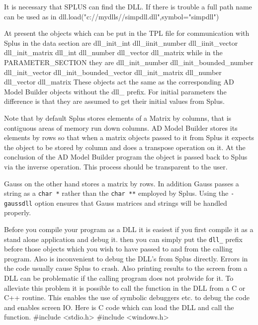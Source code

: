 It is necessary that SPLUS can find the DLL. If there is trouble a full
path name can be used as in
\beginexample
dll.load("c://mydlls//simpdll.dll",symbol="simpdll")
\endexample

At present the objects which can be put in the TPL file for communication
with Splus in the data section are
\beginexample
dll_init_int
dll_iinit_number
dll_iinit_vector
dll_init_matrix
dll_int
dll_number
dll_vector
dll_matrix
\endexample
while in the PARAMETER\_SECTION they are
\beginexample
dll_init_number
dll_init_bounded_number
dll_init_vector
dll_init_bounded_vector
dll_init_matrix
dll_number
dll_vector
dll_matrix
\endexample
These objects act the same as the corresponding AD Model Builder objects
without the dll\_ prefix. For initial parameters the difference is that
they are assumed to get their initial values from Splus.

Note that by default Splus stores elements of a Matrix by columns, that
is contiguous areas of memory run down columns. AD Model Builder stores
its elements by rows so that when a matrix objects passed to it from
Splus it expects the object to be stored by column and does a transpose
operation on it. At the  conclusion of the AD Model Builder program
the object is passed back to Splus via the inverse operation. This
process should be transparent to the user. 

Gauss on the other hand stores a matrix by rows. 
In addition Gauss passes a string as a {\tt char *} rather than the
{\tt char **} employed by Splus.
Using the {\tt -gaussdll}
option ensures that Gauss matrices and strings will be handled properly.

Before you compile your program as a DLL it is easiest if you
first compile it as a stand alone application and debug it.
then you can simply put the {\tt dll\_} prefix before
those objects which you wish to have passed to and from
the calling program.
Also is inconvenient to debug the DLL's from Splus directly.
Errors in the code usually cause Splus to crash. 
Also printing results to the screen from a DLL can
be problematic if the calling program does not
probvide for it. To alleviate this
problem it is possible to call the function in the DLL
from a C or C++ routine. This enables the use of symbolic debuggers etc.
to debug the code and enables screen IO. 
Here is C code which can load the DLL and call the function.
\beginexample
#include <stdio.h>
#include <windows.h>

